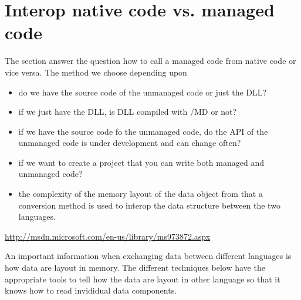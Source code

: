 \section{Interop native code vs. managed code}

%   
%   
%   
%   
%   
%   

The section answer the question how to call a managed code from native code or vice versa.
The method we choose depending upon
\begin{itemize}
  \item do we have the source code of the unmanaged code or just the DLL?
  \item if we just have the DLL, is DLL compiled with /MD or not?
  
  \item if we have the source code fo the unmanaged code, do the API of the unmanaged code is under development and can change often?
  
  \item if we want to create a project that you can write both managed and unmanaged code? 
  
  \item the complexity of the memory layout of the data object from that a conversion method is used to interop the data structure between the two languages. 
\end{itemize}
\url{http://msdn.microsoft.com/en-us/library/ms973872.aspx}


An important information when exchanging data between different languages is how
data are layout in memory. The different techniques below have the appropriate
tools to tell how the data are layout in other language so that it knows how to
read invididual data components.

